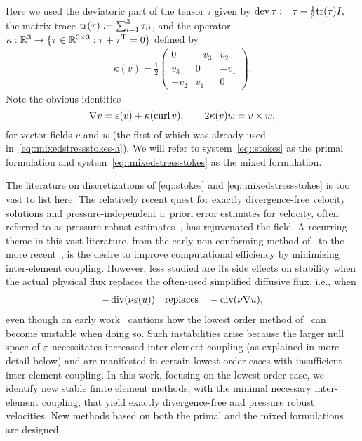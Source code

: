 Here we used the deviatoric part of the tensor $\tau$ given by
$
  \operatorname{dev}{\tau} := \tau - \frac{1}{3}{\operatorname{tr}(\tau)} I,
$
the matrix trace ${\operatorname{tr}(\tau)} := \sum_{i=1}^3 \tau_{ii}$, and the
operator $  \kappa: \mathbb{R}^{3} \to \{\tau \in \mathbb{R}^{3 \times 3}: \tau +
\tau^{{\operatorname{T}}} = 0 \}$ defined by 
\begin{align*}
  \kappa(v) =
  \frac 1 2 
  \begin{pmatrix}
    0 & -v_3 & v_2 \\
    v_3 & 0 & -v_1 \\
    -v_2 & v_1 & 0
  \end{pmatrix}.
\end{align*}
Note the obvious identities
\begin{equation}
  \label{eq:kappa-identities}
  \nabla v = \varepsilon(v) + \kappa(\operatorname{curl} v),
  \qquad
  2 \kappa(v) w = v \times w,
\end{equation}
for vector fields $v$ and $w$ (the first of which was already  used in~\eqref{eq::mixedstressstokes-a}).
We will refer to system~\eqref{eq::stokes} as the primal
formulation and system~\eqref{eq::mixedstressstokes} as the mixed formulation.


The literature on discretizations of \eqref{eq::stokes} and
\eqref{eq::mixedstressstokes} is too vast to list here.  The
relatively  recent quest for exactly divergence-free velocity
solutions and pressure-independent a~priori error estimates for
velocity, often referred to as pressure robust
estimates~\cite{linke2014role, 2016arXiv160903701L}, has rejuvenated
the field.  A recurring theme in this vast literature, from the early
non-conforming method of~\cite{CrouzRavia73} to the more
recent~\cite{LS_CMAME_2016}, is the desire to improve computational
efficiency by minimizing inter-element coupling. However, less studied
are its side effects on stability when
 the actual physical flux replaces 
the often-used simplified diffusive flux, i.e., when
\begin{align} \label{eq::nablavseps}
  -\operatorname{div}(\nu \varepsilon(u))
  \quad \textrm{replaces} \quad
  -\operatorname{div}(\nu \nabla u),
\end{align}
even though an early work~\cite{Falk91} cautions how the lowest order
method of~\cite{CrouzRavia73} can become unstable when doing so.
Such instabilities arise because the larger null space of $\varepsilon$
necessitates increased inter-element coupling (as explained in more
detail below) and are manifested in certain lowest order cases with
insufficient inter-element coupling.  In this work, focusing on the
lowest order case, we identify new stable finite element methods, with
the minimal necessary inter-element coupling, that yield exactly
divergence-free and pressure robust velocities.
New methods based on both the primal and the mixed
formulations are designed.


